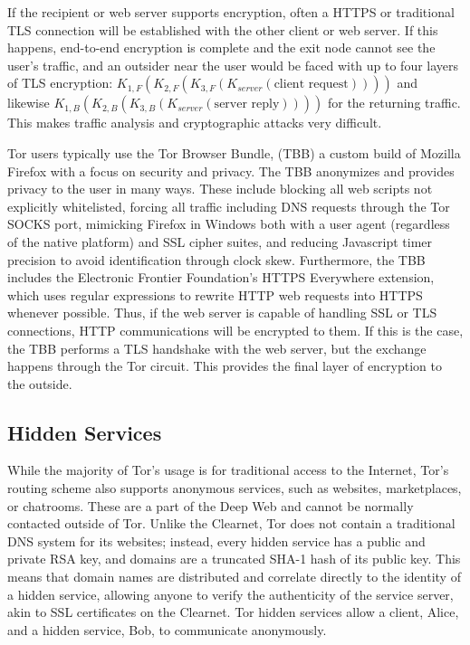 
If the recipient or web server supports encryption, often a HTTPS or traditional TLS connection will be established with the other client or web server. If this happens, end-to-end encryption is complete and the exit node cannot see the user's traffic, and an outsider near the user would be faced with up to four layers of TLS encryption: $K_{1,F}(K_{2,F}(K_{3,F}(K_{server}(\textrm{client\ request}))))$ and likewise $K_{1,B}(K_{2,B}(K_{3,B}(K_{server}(\textrm{server\ reply}))))$ for the returning traffic. This makes traffic analysis and cryptographic attacks very difficult.

Tor users typically use the Tor Browser Bundle, (TBB) a custom build of Mozilla Firefox with a focus on security and privacy. The TBB anonymizes and provides privacy to the user in many ways. These include blocking all web scripts not explicitly whitelisted, forcing all traffic including DNS requests through the Tor SOCKS port, mimicking Firefox in Windows both with a user agent (regardless of the native platform) and SSL cipher suites, and reducing Javascript timer precision to avoid identification through clock skew. Furthermore, the TBB includes the Electronic Frontier Foundation's HTTPS Everywhere extension, which uses regular expressions to rewrite HTTP web requests into HTTPS whenever possible. Thus, if the web server is capable of handling SSL or TLS connections, HTTP communications will be encrypted to them. If this is the case, the TBB performs a TLS handshake with the web server, but the exchange happens through the Tor circuit. This provides the final layer of encryption to the outside.

\subsection{Hidden Services}

While the majority of Tor's usage is for traditional access to the Internet, Tor's routing scheme also supports anonymous services, such as websites, marketplaces, or chatrooms. These are a part of the Deep Web and cannot be normally contacted outside of Tor. Unlike the Clearnet, Tor does not contain a traditional DNS system for its websites; instead, every hidden service has a public and private RSA key, and domains are a truncated SHA-1 hash of its public key. This means that domain names are distributed and correlate directly to the identity of a hidden service, allowing anyone to verify the authenticity of the service server, akin to SSL certificates on the Clearnet. Tor hidden services allow a client, Alice, and a hidden service, Bob, to communicate anonymously.\cite{TorOverview}

